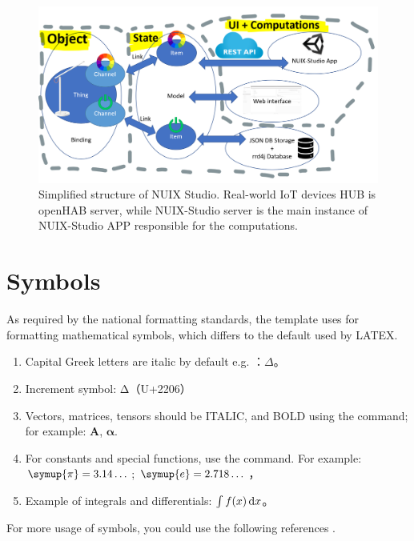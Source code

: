 \begin{figure}
  \centering
  \includegraphics[width=0.9\linewidth]{figures/ExtendedServerStructure.png}
  \caption{Simplified structure of NUIX Studio. Real-world IoT devices HUB is openHAB server, while NUIX-Studio server is the main instance of NUIX-Studio APP responsible for the computations.}
  \label{fig:ExtendedServerStructure-figure}
\end{figure}

\section{Symbols}

As required by the national formatting standards, the template uses  for formatting mathematical symbols, which differs to the default used by LATEX. 

\begin{enumerate}
  \item Capital Greek letters are italic by default e.g. ：$\Delta$。
  \item Increment symbol: $\increment$（U+2206）
  \item Vectors, matrices, tensors should be ITALIC, and BOLD using the  command; for example: $\symbf{A}$, $\symbf{\alpha}$.
  \item For constants and special functions, use the  command. For example:
    $\symup{\pi} = 3.14\dots$; $\symup{e} = 2.718\dots$，
  \item Example of integrals and differentials: $\int f(x) \mathop{}\!\mathrm{d} x$。
\end{enumerate}

For more usage of symbols, you could use the following references
\href{http://mirrors.ctan.org/macros/latex/contrib/unicode-math/unicode-math.pdf}{}
\href{http://mirrors.ctan.org/macros/latex/contrib/unicode-math/unimath-symbols.pdf}{}.

